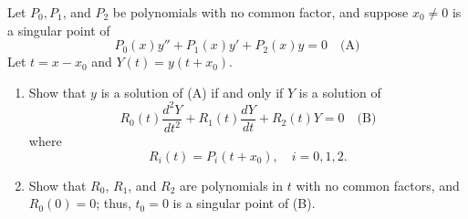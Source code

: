 \documentclass{ximera}
\begin{document}
\begin{problem}\label{exer:7.4.23}
Let  $P_0,P_1$, and $P_2$ be polynomials  with no common factor,  and
suppose   $x_0\neq 0$ is a singular point of
$$
P_0(x)y''+P_1(x)y'+P_2(x)y=0\quad
\text{(A)}
$$
Let $t=x-x_0$ and $Y(t)=y(t+x_0)$.
\begin{enumerate}
\item %
Show that $y$ is a solution of (A) if and only if $Y$
is a solution of
$$
R_0(t)\frac{d^2Y}{ dt^2}+R_1(t)\frac{dY}{ dt}+R_2(t)Y=0\quad
\text{(B)}
$$
where
$$
R_i(t)=P_i(t+x_0),\quad i=0,1,2.
$$
\item %
Show that $R_0$, $R_1$, and $R_2$ are polynomials in $t$ with no common
factors, and $R_0(0)=0$;   thus,  $t_0=0$ is a singular
point of (B).
\end{enumerate}
\end{problem}
\end{document}
